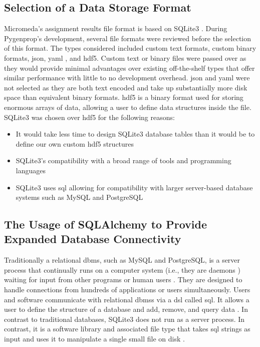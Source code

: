 \subsection{Selection of a Data Storage Format}

Micromeda's assignment results file format is based on SQLite3 \cite{owens2006definitive}. During Pygenprop's development, several file formats were reviewed before the selection of this format. The types considered included custom text formats, custom binary formats, \gls{json}, \gls{yaml} \cite{ben2005yaml}, and \gls{hdf5}. Custom text or binary files were passed over as they would provide minimal advantages over existing off-the-shelf types that offer similar performance with little to no development overhead. \gls{json} and \gls{yaml} were not selected as they are both text encoded and take up substantially more disk space than equivalent binary formats. \gls{hdf5} \cite{folk2011overview} is a binary format used for storing enormous arrays of data, allowing a user to define data structures inside the file. SQLite3 was chosen over \gls{hdf5} for the following reasons:

\begin{itemize}
\item It would take less time to design SQLite3 database tables than it would be to define our own custom \gls{hdf5} structures
\item SQLite3's compatibility with a broad range of tools and programming languages
\item SQLite3 uses \gls{sql} \cite{sql1987guide} allowing for compatibility with larger server-based database systems such as MySQL \cite{dubois1999mysql} and PostgreSQL \cite{momjian2001postgresql, owens2006definitive}
\end{itemize}

\subsection{The Usage of SQLAlchemy to Provide Expanded Database Connectivity} \label{SQLAlchemy}

Traditionally a relational \gls{dbms}, such as MySQL and PostgreSQL, is a server process that continually runs on a computer system (i.e., they are daemons \cite{martin2006computer}) waiting for input from other programs or human users \cite{dubois1999mysql, momjian2001postgresql}. They are designed to handle connections from hundreds of applications or users simultaneously. Users and software communicate with relational \gls{dbms}s via a \gls{dsl} called \gls{sql}. It allows a user to define the structure of a database and add, remove, and query data \cite{sql1987guide}. In contrast to traditional databases, SQLite3 does not run as a server process. In contrast, it is a software library and associated file type that takes \gls{sql} strings as input and uses it to manipulate a single small file on disk \cite{owens2006definitive}.

